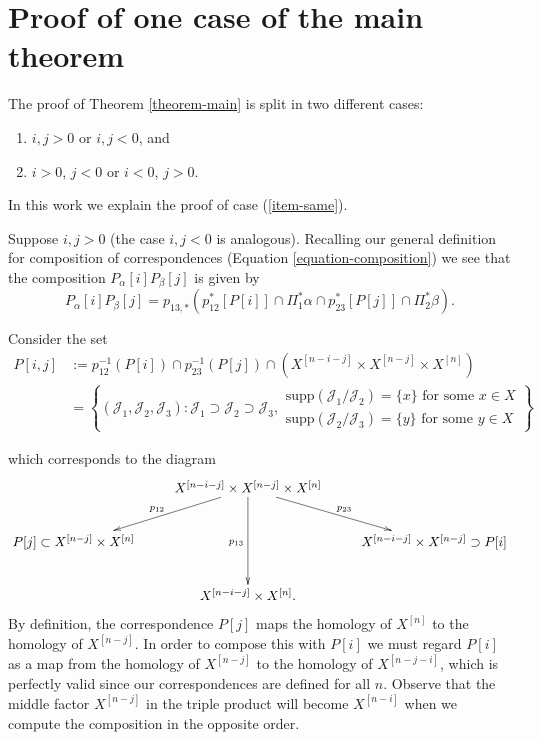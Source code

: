 \section{Proof of one case of the main
theorem}
\label{section-proof}

\noindent
The proof of Theorem \ref{theorem-main} is
split
in two different cases:
\begin{enumerate}
\item $i,j>0$ or $i,j<0$, and
\label{item-same}
\item $i>0$, $j<0$ or $i<0$, $j>0$.
\label{item-different}
\end{enumerate}

\noindent
In this work we explain the proof of case
(\ref{item-same}).

\medskip\noindent
Suppose $i,j>0$ (the case $i,j<0$ is
analogous).
Recalling our general definition for
composition of correspondences
(Equation \ref{equation-composition})
we see that
the composition $P_\alpha[i]P_\beta[j]$ is
given by
\begin{equation}
\label{equation-composition-pij}
P_\alpha[i]P_\beta[j]
=p_{13,*}(p_{12}^*[P[i]]\cap\Pi_1^*\alpha\cap p_{23}^*[P[j]]\cap\Pi_2^*\beta).
\end{equation}

Consider the set
\begin{equation}
\label{equation-cycle-pij}
\begin{aligned}
P[i,j]&:=p_{12}^{-1}(P[i])\cap
p_{23}^{-1}(P[j])
\cap(X^{[n-i-j]}\times X^{[n-j]}\times
X^{[n]})\\
&=\left\{(\mathcal{J}_1,\mathcal{J}_2,\mathcal{J}_3):
\mathcal{J}_1\supset\mathcal{J}_2\supset\mathcal{J}_3,
\substack{
\text{supp}(\mathcal{J}_1/\mathcal{J}_2)=\{x\}
\text{ for some }x\in X\\
\text{supp}(\mathcal{J}_2/\mathcal{J}_3)=\{y\}
\text{ for some }y \in X }\right\}
\end{aligned}
\end{equation}

\noindent
which corresponds to the diagram
$$
\xymatrix{
&  X^{[n-i-j]} \times X^{[n-j]} \times
X^{[n]}
\ar[dl]_{p_{12}}\ar[dr]^{p_{23}}\ar[dd]_{p_{13}}\\
P[j]\subset X^{[n-j]}\times X^{[n]}& &
X^{[n-i-j]}\times X^{[n-j]}\supset P[i]\\
& X^{[n-i-j]}\times X^{[n]}.
}
$$
By definition, the correspondence $P[j]$
maps the homology of $X^{[n]}$ to the
homology of $X^{[n-j]}$. In order to compose
this with $P[i]$
we must regard $P[i]$ as a map from the
homology of $X^{[n-j]}$
to the homology of $X^{[n-j-i]}$, which is
perfectly
valid since our correspondences are defined
for all $n$.
Observe that the middle factor $X^{[n-j]}$
in the triple product will become
$X^{[n-i]}$ when
we compute the composition in the opposite
order.

